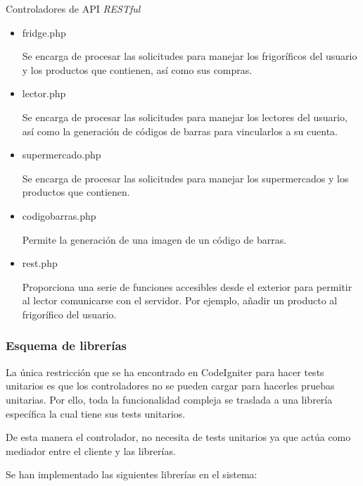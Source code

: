 Controladores de API \emph{RESTful}

    \begin{itemize}
        \item fridge.php

            Se encarga de procesar las solicitudes para manejar los frigoríficos del usuario y los productos que contienen, así como sus compras.

        \item lector.php

            Se encarga de procesar las solicitudes para manejar los lectores del usuario, así como la generación de códigos de barras para vincularlos a su cuenta.

        \item supermercado.php

            Se encarga de procesar las solicitudes para manejar los supermercados y los productos que contienen.

        \item codigobarras.php

            Permite la generación de una imagen de un código de barras.

        \item rest.php

            Proporciona una serie de funciones accesibles desde el exterior para permitir al lector comunicarse con el servidor. Por ejemplo, añadir un producto al frigorífico del usuario.

    \end{itemize}

    \subsubsection{Esquema de librerías}

La única restricción que se ha encontrado en CodeIgniter para hacer tests unitarios es que los controladores no se pueden cargar para hacerles pruebas unitarias. Por ello, toda la funcionalidad compleja se traslada a una librería específica la cual tiene sus tests unitarios.

De esta manera el controlador, no necesita de tests unitarios ya que actúa como mediador entre el cliente y las librerías.

Se han implementado las siguientes librerías en el sistema:

